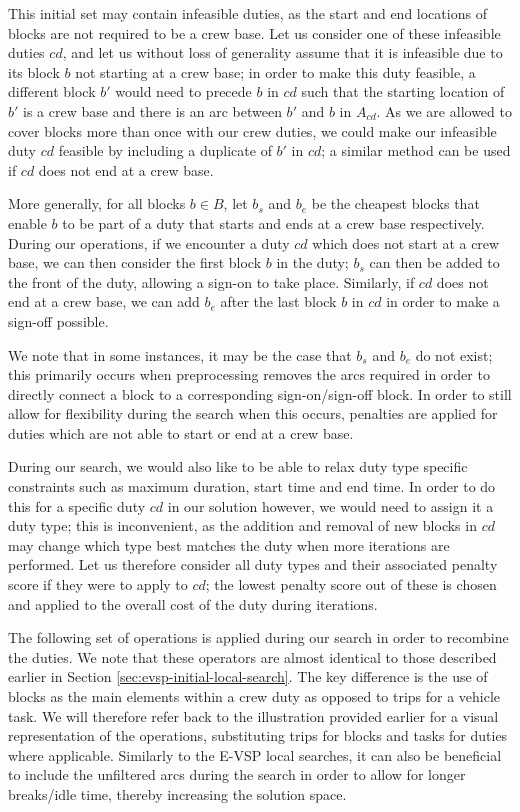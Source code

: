 \documentclass[]{article}
\begin{document}
This initial set may contain infeasible duties, as the start and end locations of blocks are not required to be a crew base. Let us consider one of these infeasible duties $cd$, and let us without loss of generality assume that it is infeasible due to its block $b$ not starting at a crew base; in order to make this duty feasible, a different block $b'$ would need to precede $b$ in $cd$ such that the starting location of $b'$ is a crew base and there is an arc between $b'$ and $b$ in $A_{cd}$. As we are allowed to cover blocks more than once with our crew duties, we could make our infeasible duty $cd$ feasible by including a duplicate of $b'$ in $cd$; a similar method can be used if $cd$ does not end at a crew base.

More generally, for all blocks $b \in B$, let $b_s$ and $b_e$ be the cheapest blocks that enable $b$ to be part of a duty that starts and ends at a crew base respectively. During our operations, if we encounter a duty $cd$ which does not start at a crew base, we can then consider the first block $b$ in the duty; $b_s$ can then be added to the front of the duty, allowing a sign-on to take place. Similarly, if $cd$ does not end at a crew base, we can add $b_e$ after the last block $b$ in $cd$ in order to make a sign-off possible. 

We note that in some instances, it may be the case that $b_s$ and $b_e$ do not exist; this primarily occurs when preprocessing removes the arcs required in order to directly connect a block to a corresponding sign-on/sign-off block. In order to still allow for flexibility during the search when this occurs, penalties are applied for duties which are not able to start or end at a crew base. 

During our search, we would also like to be able to relax duty type specific constraints such as maximum duration, start time and end time. In order to do this for a specific duty $cd$ in our solution however, we would need to assign it a duty type; this is inconvenient, as the addition and removal of new blocks in $cd$ may change which type best matches the duty when more iterations are performed. Let us therefore consider all duty types and their associated penalty score if they were to apply to $cd$; the lowest penalty score out of these is chosen and applied to the overall cost of the duty during iterations. 

The following set of operations is applied during our search in order to recombine the duties. We note that these operators are almost identical to those described earlier in Section \ref{sec:evsp-initial-local-search}. The key difference is the use of blocks as the main elements within a crew duty as opposed to trips for a vehicle task. We will therefore refer back to the illustration provided earlier for a visual representation of the operations, substituting trips for blocks and tasks for duties where applicable. Similarly to the E-VSP local searches, it can also be beneficial to include the unfiltered arcs during the search in order to allow for longer breaks/idle time, thereby increasing the solution space.
\end{document}
